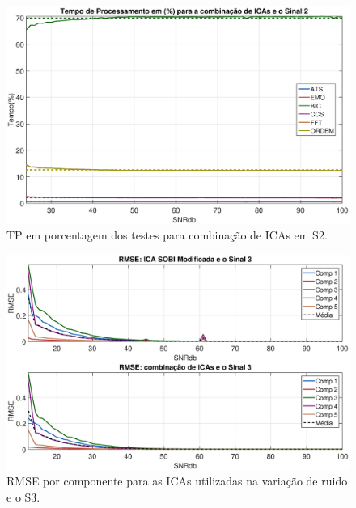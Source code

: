 \documentclass[a4paper,12pt]{monografia}
\theoremstyle{plain}
\theoremstyle{definition}
\theoremstyle{remark}
\begin{document}
\begin{figure}[!htb]
    \begin{center}
    \advance\leftskip -1.5cm
    \includegraphics[scale=0.45]{imagens/ImagensParaOAnexo/TPPRCombinacaoICASinal2.eps}
    \caption{TP em porcentagem dos testes para combinação de ICAs em S2.}
    \label{fig:TPCIRS2}    
    \end{center}
\end{figure}

\begin{figure}[!htb]
    \begin{center}
    \advance\leftskip -1.5cm
    \includegraphics[scale=0.45]{imagens/ImagensParaOAnexo/RMSEcompRTodasICAsSinal3.eps}
    \caption{RMSE por componente para as ICAs utilizadas na variação de ruido e o S3.}
    \label{fig:RMSERS3}    
    \end{center}
\end{figure}
\end{document}
